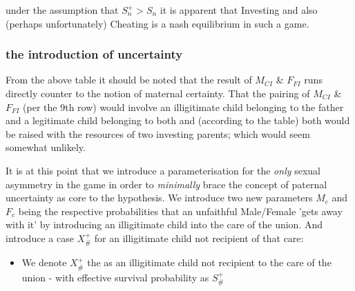 \documentclass[journal,article,accept,oneauthors,pdftex,10pt,a4paper]{mdpi}
\begin{document}
under the assumption that $S^+_n>S_n$ it is apparent that Investing and also (perhaps unfortunately) Cheating is a nash equilibrium in such a game.

\subsubsection{the introduction of uncertainty}

From the above table it should be noted that the result of $M_{CI}$ \& $F_{FI}$ runs directly counter to the notion of maternal certainty.
That the pairing of $M_{CI}$ \& $F_{FI}$ (per the 9th row) would involve an illigitimate child belonging to the father and a legitimate child belonging to both and (according to the table) both would be raised with the resources of two investing parents; which would seem somewhat unlikely.

It is at this point that we introduce a parameterisation for the \textit{only} sexual asymmetry in the game in order to \textit{minimally} brace the concept of paternal uncertainty as core to the hypothesis.
We introduce two new parameters $M_c$ and $F_c$ being the respective probabilities that an unfaithful Male/Female 'gets away with it' by introducing an illigitimate child into the care of the union. 
And introduce a case $X^+_\#$ for an illigitimate child not recipient of that care:
\begin{itemize}
  \item We denote $X^+_\#$ the as an illigitimate child not recipient to the care of the union - with effective survival probability as $S^+_\#$
\end{itemize}
\end{document}
